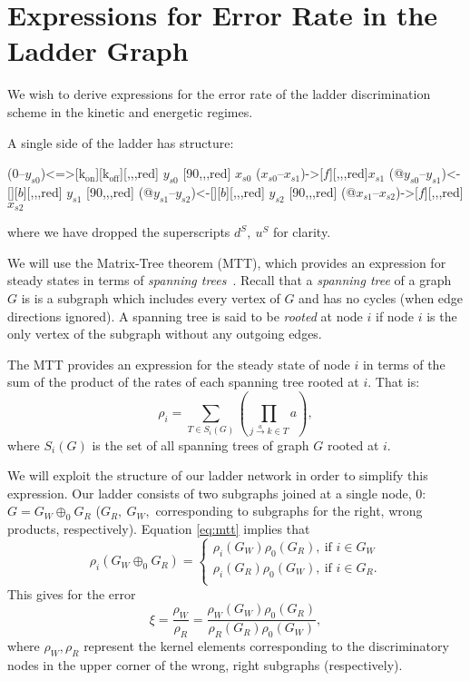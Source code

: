 \section{Expressions for Error Rate in the Ladder Graph}
\label{app:ladder_error}
We wish to derive expressions for the error rate of the ladder discrimination scheme in the kinetic and energetic regimes.

A single side of the ladder has structure:
\begin{center}
 \arrow(0--$y_{s0}$){<=>[$\mathrm{k_{on}}$][$\mathrm{k_{off}}$]}[,,,red] $y_{s0}$
\arrow{<=>[$u$][$d$]}[90,,,red] 
$x_{s0}$ \arrow($x_{s0}$--$x_{s1}$){->[$f$]}[,,,red]$x_{s1}$
\arrow(@$y_{s0}$--$y_{s1}$){<-[][$b$]}[,,,red] $y_{s1}$ \arrow{<=>[$u$][$d$]}[90,,,red]
\arrow(@$y_{s1}$--$y_{s2}$){<-[][$b$]}[,,,red] $y_{s2}$
\arrow{<=>[$u$][$d$]}[90,,,red] 
\arrow(@$x_{s1}$--$x_{s2}$){->[$f$]}[,,,red] $x_{s2}$
\schemestop
\end{center}
where we have dropped the superscripts $d^S, \ u^S$ for clarity.

We will use the Matrix-Tree theorem (MTT), which provides an expression for steady states in terms of {\it spanning trees}~\cite{Wong2018}.  Recall that a {\it spanning tree} of a graph $G$ is is a subgraph which includes every vertex of $G$ and has no cycles (when edge directions ignored).  A spanning tree is said to be {\it rooted} at node $i$ if node $i$ is the only vertex of the subgraph without any outgoing edges.

The MTT provides an expression for the steady state of node $i$ in terms of the sum of the product of the rates of each spanning tree rooted at $i$.  That is:
\begin{equation}\label{eq:mtt}
\rho_i = \sum_{T\in S_i(G) }\left(\prod_{j\stackrel{a}{\to} k\in T}a \right),
\end{equation}
where $S_i(G)$ is the set of all spanning trees of graph $G$ rooted at $i$.

We will exploit the structure of our ladder network in order to simplify this expression.  Our ladder consists of two subgraphs joined at a single node, 0: $G = G_W \oplus_0 G_R$ ($G_R, \ G_W,$ corresponding to subgraphs for the right, wrong products, respectively).  Equation \ref{eq:mtt} implies that
\[
\rho_i(G_W \oplus_0 G_R) =
 \begin{cases}
       \rho_i(G_W)\rho_0(G_R), \ \text{if } i\in G_W\\
      \rho_i(G_R)\rho_0(G_W), \ \text{if } i\in G_R.\\
\end{cases}
\]
This gives for the error
\begin{equation}\label{jer_span}
\xi = \frac{\rho_W}{\rho_R} = \frac{\rho_W(G_W)\rho_0(G_R)}{\rho_R(G_R)\rho_0(G_W)},
\end{equation}
where $\rho_W, \rho_R$ represent the kernel elements corresponding to the discriminatory nodes in the upper corner of the wrong, right subgraphs (respectively).

